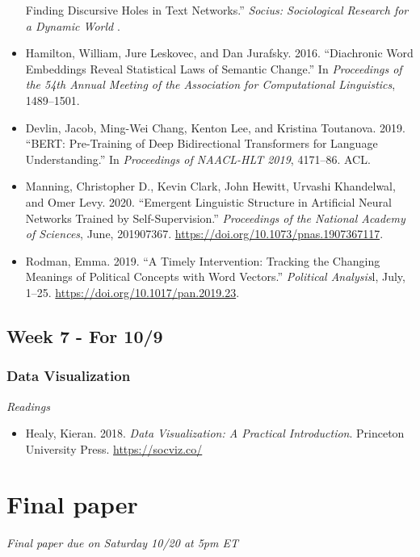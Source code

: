 \documentclass[
  10pt,
]{article}
\providecommand{\tightlist}{%
  \setlength{\itemsep}{0pt}\setlength{\parskip}{0pt}}
\begin{document}
\begin{itemize}
  Finding Discursive Holes in Text Networks.'' \emph{Socius:
  Sociological Research for a Dynamic World} .
\item
  Hamilton, William, Jure Leskovec, and Dan Jurafsky. 2016. ``Diachronic
  Word Embeddings Reveal Statistical Laws of Semantic Change.'' In
  \emph{Proceedings of the 54th Annual Meeting of the Association for
  Computational Linguistics}, 1489--1501.
\item
  Devlin, Jacob, Ming-Wei Chang, Kenton Lee, and Kristina Toutanova.
  2019. ``BERT: Pre-Training of Deep Bidirectional Transformers for
  Language Understanding.'' In \emph{Proceedings of NAACL-HLT 2019},
  4171--86. ACL.
\item
  Manning, Christopher D., Kevin Clark, John Hewitt, Urvashi Khandelwal,
  and Omer Levy. 2020. ``Emergent Linguistic Structure in Artificial
  Neural Networks Trained by Self-Supervision.'' \emph{Proceedings of
  the National Academy of Sciences}, June, 201907367.
  \url{https://doi.org/10.1073/pnas.1907367117}.
\item
  Rodman, Emma. 2019. ``A Timely Intervention: Tracking the Changing
  Meanings of Political Concepts with Word Vectors.'' \emph{Political
  Analysis}l, July, 1--25. \url{https://doi.org/10.1017/pan.2019.23}.
\end{itemize}

\hypertarget{week-7---for-109}{%
\subsection{Week 7 - For 10/9}\label{week-7---for-109}}

\hypertarget{data-visualization}{%
\subsubsection{Data Visualization}\label{data-visualization}}

\emph{Readings}

\begin{itemize}
\tightlist
\item
  Healy, Kieran. 2018. \emph{Data Visualization: A Practical
  Introduction}. Princeton University Press. \url{https://socviz.co/}
\end{itemize}

\hypertarget{final-paper}{%
\section{Final paper}\label{final-paper}}

\emph{Final paper due on Saturday 10/20 at 5pm ET}
\end{document}
